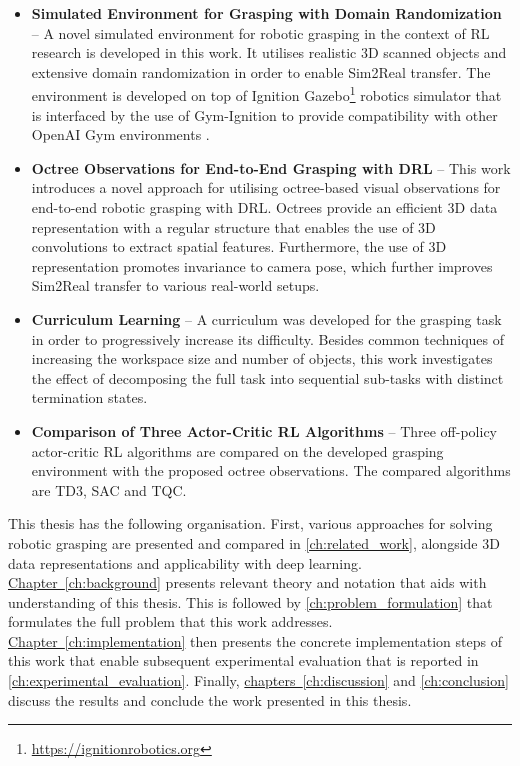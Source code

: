 \begin{itemize}
    \item \textbf{Simulated Environment for Grasping with Domain Randomization} -- A novel simulated environment for robotic grasping in the context of RL research is developed in this work. It utilises realistic 3D scanned objects and extensive domain randomization in order to enable Sim2Real transfer. The environment is developed on top of Ignition Gazebo\footnote{\href{https://ignitionrobotics.org}{https://ignitionrobotics.org}} robotics simulator that is interfaced by the use of Gym-Ignition \cite{ferigo_gym-ignition_2020} to provide compatibility with other OpenAI Gym environments \cite{brockman_openai_2016}.
    \item \textbf{Octree Observations for End-to-End Grasping with DRL} -- This work introduces a novel approach for utilising octree-based visual observations for end-to-end robotic grasping with DRL. Octrees provide an efficient 3D data representation with a regular structure that enables the use of 3D convolutions to extract spatial features. Furthermore, the use of 3D representation promotes invariance to camera pose, which further improves Sim2Real transfer to various real-world setups.
    \item \textbf{Curriculum Learning} -- A curriculum was developed for the grasping task in order to progressively increase its difficulty. Besides common techniques of increasing the workspace size and number of objects, this work investigates the effect of decomposing the full task into sequential sub-tasks with distinct termination states.
    \item \textbf{Comparison of Three Actor-Critic RL Algorithms} -- Three off-policy actor-critic RL algorithms are compared on the developed grasping environment with the proposed octree observations. The compared algorithms are TD3, SAC and TQC.
\end{itemize}

This thesis has the following organisation. First, various approaches for solving robotic grasping are presented and compared in \autoref{ch:related_work}, alongside 3D data representations and applicability with deep learning. \hyperref[ch:background]{Chapter~\ref*{ch:background}} presents relevant theory and notation that aids with understanding of this thesis. This is followed by \autoref{ch:problem_formulation} that formulates the full problem that this work addresses. \hyperref[ch:implementation]{Chapter~\ref*{ch:implementation}} then presents the concrete implementation steps of this work that enable subsequent experimental evaluation that is reported in \autoref{ch:experimental_evaluation}. Finally, \hyperref[ch:discussion]{chapters~\ref*{ch:discussion}} and \ref{ch:conclusion} discuss the results and conclude the work presented in this thesis.
